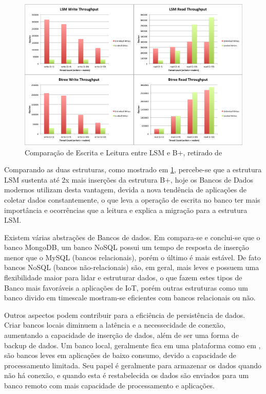 \begin{figure}[h!]
\centering
\includegraphics[width=14cm]{./02_Capitulos/02_Cap3/figures/LSM_btree}
\caption{Comparação de Escrita e Leitura entre LSM e B+, retirado de \cite{btrees-vs-lsmtrees}}
\label{fig:3.3.5/b-lsm}
\end{figure}

Comparando as duas estruturas, como mostrado em \ref{fig:3.3.5/b-lsm}, percebe-se que a estrutura LSM sustenta até 2x mais inserções da estrutura B+, hoje os Bancos de Dados modernos utilizam desta vantagem, devida a nova tendência de aplicações de coletar dados constantemente, o que leva a operação de escrita no banco ter mais importância e ocorrências que a leitura e explica a migração para a estrutura LSM.

Existem várias abstrações de Bancos de dados. Em \cite{Rautmare-Bhalerao} compara-se e conclui-se que o banco MongoDB, um banco NoSQL possui um tempo de resposta de inserção menor que o MySQL (bancos relacionais), porém o último é mais estável. De fato bancos NoSQL (bancos não-relacionais) são, em geral, mais leves e possuem uma flexibilidade maior para lidar e estruturar dados, o que fazem estes tipos de Banco mais favoráveis a aplicações de IoT, porém outras estruturas como um banco divido em timescale mostram-se eficientes com bancos relacionais ou não.

Outros aspectos podem contribuir para a eficiência de persistência de dados. Criar bancos locais diminuem a latência e a necessecidade de conexão, aumentando a capacidade de inserção de dados, além de ser uma forma de backup de dados. Um banco local, geralmente fica em uma plataforma como em \cite{Paethong-Sato-Namiki}, são bancos leves em aplicações de baixo consumo, devido a capacidade de processamento limitada. Seu papel é geralmente para armazenar os dados quando não há conexão, e quando esta é restabelecida os dados são enviados para um banco remoto com mais capacidade de processamento e aplicações. %


